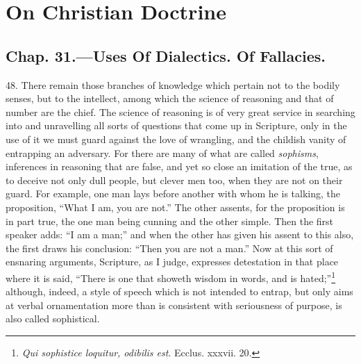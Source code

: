
\author{Augustine of Hippo}
\chapter[On Christian Doctrine, bk 2.31--2.34]{On Christian
Doctrine}

\section{Chap. 31.\smaller---Uses Of Dialectics. Of
Fallacies.}

48. There remain those branches of knowledge which pertain not to the
bodily senses, but to the intellect, among which the science of
reasoning and that of number are the chief. The science of reasoning
is of very great service in searching into and unravelling all sorts
of questions that come up in Scripture, only in the use of it we must
guard against the love of wrangling, and the childish vanity of
entrapping an adversary. For there are many of what are called
\textit{sophisms}, inferences in reasoning that are false, and yet so
close an imitation of the true, as to deceive not only dull people,
but clever men too, when they are not on their guard. For example, one
man lays before another with whom he is talking, the proposition,
``What I am, you are not.'' The other assents, for the proposition is
in part true, the one man being cunning and the other simple. Then the
first speaker adds: ``I am a man;'' and when the other has given his
assent to this also, the first draws his conclusion: ``Then you are
not a man.'' Now at this sort of ensnaring arguments, Scripture, as I
judge, expresses detestation in that place where it is said, ``There
is one that showeth wisdom in words, and is
hated;''\footnote{\textit{Qui sophistice loquitur, odibilis est}.
Ecclus. xxxvii. 20.} although, indeed, a style of speech which is not
intended to entrap, but  only aims at verbal ornamentation
more than is consistent with seriousness of purpose, is also called
sophistical.


